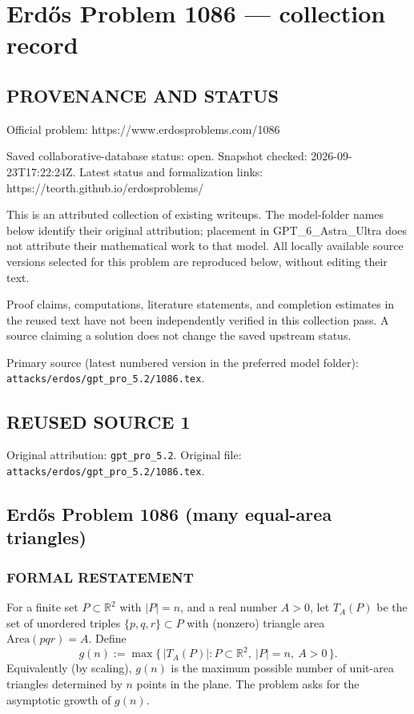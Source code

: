 \section*{Erd\H{o}s Problem 1086 --- collection record}

\subsection*{PROVENANCE AND STATUS}
Official problem: https://www.erdosproblems.com/1086

Saved collaborative-database status: open.
Snapshot checked: 2026-09-23T17:22:24Z.
Latest status and formalization links: https://teorth.github.io/erdosproblems/

This is an attributed collection of existing writeups. The model-folder names below identify their original attribution; placement in GPT\_6\_Astra\_Ultra does not attribute their mathematical work to that model. All locally available source versions selected for this problem are reproduced below, without editing their text.

Proof claims, computations, literature statements, and completion estimates in the reused text have not been independently verified in this collection pass. A source claiming a solution does not change the saved upstream status.

Primary source (latest numbered version in the preferred model folder): \texttt{attacks/erdos/gpt\_pro\_5.2/1086.tex}.

\subsection*{REUSED SOURCE 1}
Original attribution: \texttt{gpt\_pro\_5.2}.
Original file: \texttt{attacks/erdos/gpt\_pro\_5.2/1086.tex}.


\subsection*{Erd\H{o}s Problem 1086 (many equal-area triangles)}

\subsubsection*{FORMAL RESTATEMENT}
For a finite set \(P\subset\mathbb{R}^2\) with \(|P|=n\), and a real number \(A>0\), let
\(T_A(P)\) be the set of unordered triples \(\{p,q,r\}\subset P\) with (nonzero) triangle area \(\mathrm{Area}(pqr)=A\).
Define
\[
 g(n):=\max\{\,|T_A(P)|: P\subset\mathbb{R}^2,\ |P|=n,\ A>0\,\}.
\]
Equivalently (by scaling), \(g(n)\) is the maximum possible number of unit-area triangles determined by \(n\) points in the plane.
The problem asks for the asymptotic growth of \(g(n)\).

